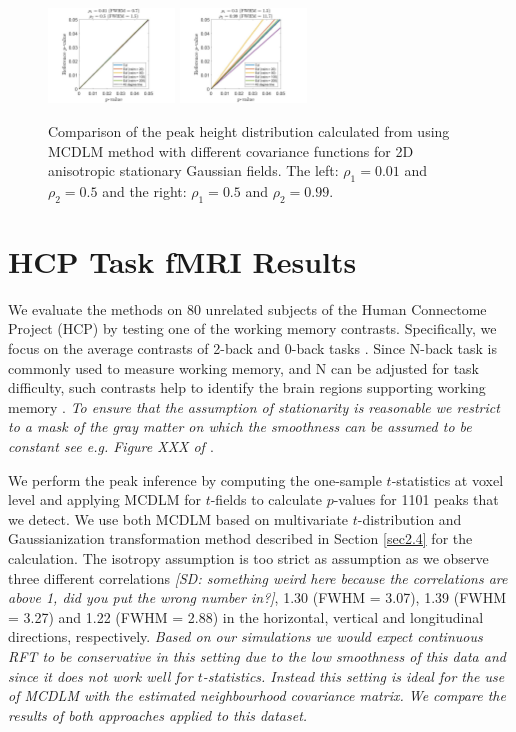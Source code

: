 \documentclass{article}
\newcommand{\sdcom}[1]{\textit{\color{red} [SD: #1]}}
\newcommand{\nt}[1]{\textit{\color{red} #1}}
\begin{document}
\begin{figure}[!htp]
\centering
\includegraphics[trim=100 5 100 5, clip,width=0.3\textwidth]{figure/2D_rho1_0.01_rho2_0.5.jpg}
\includegraphics[trim=100 5 100 5, clip,width=0.3\textwidth]{figure/2D_rho1_0.5_rho2_0.99.jpg}
\caption{Comparison of the peak height distribution calculated from using MCDLM method with different covariance functions for 2D anisotropic stationary Gaussian fields. The left: $\rho_1 = 0.01$ and $\rho_2 = 0.5$ and the right: $\rho_1 = 0.5$ and $\rho_2 = 0.99$. \label{fig15}}
\end{figure}

\section{HCP Task fMRI Results}
\label{sec5}
We evaluate the methods on 80 unrelated subjects of the Human Connectome Project (HCP) by testing one of the working memory contrasts. Specifically, we focus on the average contrasts of 2-back and 0-back tasks \citep{davenport2020selective}. Since N-back task is commonly used to measure working memory, and N can be adjusted for task difficulty, such contrasts help to identify the brain regions supporting working memory \citep{kirchner1958age}.  \nt{To ensure that the assumption of stationarity is reasonable we restrict to a mask of the gray matter on which the smoothness can be assumed to be constant see e.g. Figure XXX of \cite{eklund2016cluster}}. 

We perform the peak inference by computing the one-sample $t$-statistics at voxel level and applying MCDLM for $t$-fields to calculate $p$-values for 1101 peaks that we detect. We use both MCDLM based on multivariate $t$-distribution and Gaussianization transformation method described in Section \ref{sec2.4} for the calculation. The isotropy assumption is too strict as assumption as we observe three different correlations \sdcom{something weird here because the correlations are above 1, did you put the wrong number in?}, 1.30 (FWHM = 3.07), 1.39 (FWHM = 3.27) and 1.22 (FWHM = 2.88) in the horizontal, vertical and longitudinal directions, respectively. \nt{Based on our simulations we would expect continuous RFT to be conservative in this setting due to the low smoothness of this data and since it does not work well for $t$-statistics. Instead this setting is ideal for the use of MCDLM with the estimated neighbourhood covariance matrix. We compare the results of both approaches applied to this dataset.}
\end{document}
